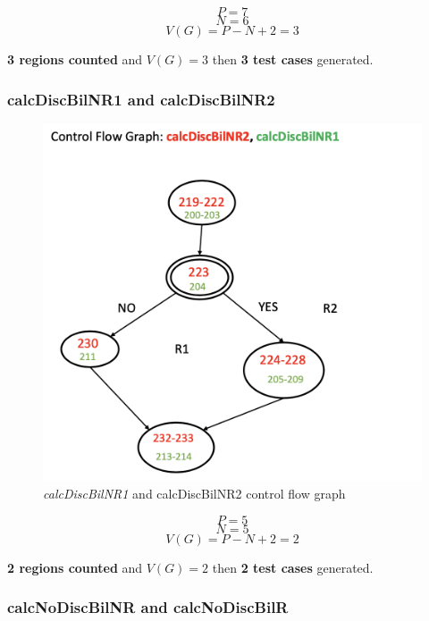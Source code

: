 \documentclass{article}
\begin{document}
    \begin{equation*}
        P = 7
    \end{equation*}
    \begin{equation*}
        N = 6
    \end{equation*}
    \begin{equation*}
        V(G) = P - N + 2 = 3
    \end{equation*}
    
    \textbf{3 regions counted} and $V(G) = 3$ then \textbf{3 test cases} generated.

    \newpage

    \subsubsection{calcDiscBilNR1 and calcDiscBilNR2}

    \begin{figure}[h!]
        \includegraphics[width=0.5\linewidth, center]{cfg/calcDiscBilNR12.png}
        \caption{\textit{calcDiscBilNR1} and \textit{}{calcDiscBilNR2} control flow graph}
        \label{fig:cfgBilNR}
    \end{figure}

    \begin{equation*}
        P = 5
    \end{equation*}
    \begin{equation*}
        N = 5
    \end{equation*}
    \begin{equation*}
        V(G) = P - N + 2 = 2
    \end{equation*}
    
    \textbf{2 regions counted} and $V(G) = 2$ then \textbf{2 test cases} generated.

    \newpage

    \subsubsection{calcNoDiscBilNR and calcNoDiscBilR}
\end{document}
